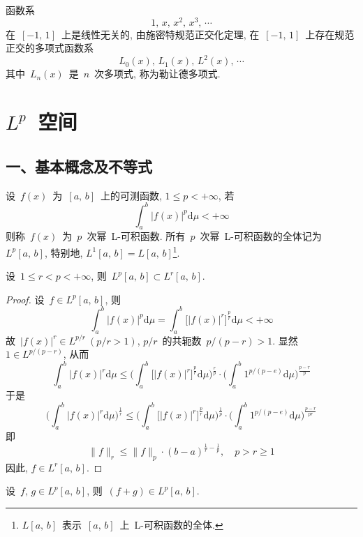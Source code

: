 \begin{Example}
函数系
\[
1,\, x,\, x^{2},\, x^{3},\, \cdots
\]
在~$[-1,\,1]$~上是线性无关的, 由施密特规范正交化定理, 在~$[-1,\,1]$~上存在规范正交的多项式函数系
\[
L_{0}(x),\, L_{1}(x),\, L^{2}(x),\, \cdots
\]
其中~$L_{n}(x)$~是~$n$~次多项式, 称为勒让德多项式.
\end{Example}

\section{$L^{p}$~空间}

\subsection*{一、基本概念及不等式}

\setcounter{footnote}{0}

\begin{Definition}
设~$f(x)$~为~$\left[a,\,b\right]$~上的可测函数, $1 \leqslant p < +\infty$, 若
\[
\int_{a}^{b}|f(x)|^{p}\mathrm{d}\mu<+\infty
\]
则称~$f(x)$~为~$p$~次幂~L-可积函数. 所有~$p$~次幂~L-可积函数的全体记为~$L^p[a,\,b]$, 特别地, $L^{1}\left[a,\,b\right]=L\left[a,\,b\right]$\footnote{$L[a,\,b]$~表示~$[a,\,b]$~上~L-可积函数的全体.}.
\end{Definition}

\begin{Proposition} \label{Pro-6-1}
设~$1 \leqslant r < p < +\infty$, 则~$L^p[a,\,b]\subset L^r[a,\,b]$.
\end{Proposition}

\begin{proof}
设~$f \in L^p[a,\,b]$, 则
\[
\int_a^b |f(x)|^p \mathrm{d} \mu = \int_a^b \big[|f(x)|^r\big]^\frac{p}{r} \mathrm{d} \mu < +\infty
\]
故~$|f(x)|^r \in L^{p/r}~(p/r > 1)$, $p/r$~的共轭数~$p/(p-r) >1$. 显然~$1 \in L^{p/(p-r)}$, 从而
\[
\int_a^b |f(x)|^r \mathrm{d} \mu \leqslant \Big( \int_a^b \big[|f(x)|^r\big]^\frac{p}{r} \mathrm{d} \mu \Big)^\frac{r}{p} \cdot
\Big(\int_a^b 1^{p/(p-e)} \mathrm{d} \mu \Big)^\frac{p-r}{p}
\]
于是
\[
\Big(\int_a^b |f(x)|^r \mathrm{d} \mu\Big)^\frac{1}{r} \leqslant \Big( \int_a^b \big[|f(x)|^r\big]^\frac{p}{r} \mathrm{d} \mu \Big)^\frac{1}{p} \cdot
\Big(\int_a^b 1^{p/(p-e)} \mathrm{d} \mu \Big)^\frac{p-r}{pr}
\]
即
\[
\|f\|_r \leqslant \|f\|_p \cdot (b-a)^{\frac{1}{r}-\frac{1}{p}}, \quad p > r \geqslant 1
\]
因此, $f \in L^r[a,\,b]$.
\end{proof}

\begin{Theorem}\label{thm-2}
设~$f,\, g\in L^p[a,\,b]$, 则~$(f+g)\in L^p[a,\,b]$.
\end{Theorem}

